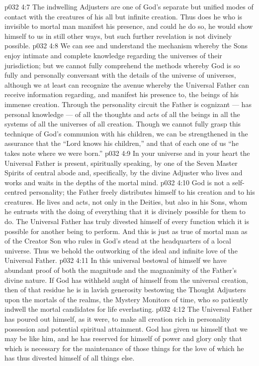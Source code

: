 \vs p032 4:7 The indwelling Adjusters are one of God’s separate but unified modes of contact with the creatures of his all but infinite creation. Thus does he who is invisible to mortal man manifest his presence, and could he do so, he would show himself to us in still other ways, but such further revelation is not divinely possible.
\vs p032 4:8 We can see and understand the mechanism whereby the Sons enjoy intimate and complete knowledge regarding the universes of their jurisdiction; but we cannot fully comprehend the methods whereby God is so fully and personally conversant with the details of the universe of universes, although we at least can recognize the avenue whereby the Universal Father can receive information regarding, and manifest his presence to, the beings of his immense creation. Through the personality circuit the Father is cognizant --- has personal knowledge --- of all the thoughts and acts of all the beings in all the systems of all the universes of all creation. Though we cannot fully grasp this technique of God’s communion with his children, we can be strengthened in the assurance that the “Lord knows his children,” and that of each one of us “he takes note where we were born.”
\vs p032 4:9 \pc In your universe and in your heart the Universal Father is present, spiritually speaking, by one of the Seven Master Spirits of central abode and, specifically, by the divine Adjuster who lives and works and waits in the depths of the mortal mind.
\vs p032 4:10 \pc God is not a self\hyp{}centred personality; the Father freely distributes himself to his creation and to his creatures. He lives and acts, not only in the Deities, but also in his Sons, whom he entrusts with the doing of everything that it is divinely possible for them to do. The Universal Father has truly divested himself of every function which it is possible for another being to perform. And this is just as true of mortal man as of the Creator Son who rules in God’s stead at the headquarters of a local universe. Thus we behold the outworking of the ideal and infinite love of the Universal Father.
\vs p032 4:11 In this universal bestowal of himself we have abundant proof of both the magnitude and the magnanimity of the Father’s divine nature. If God has withheld aught of himself from the universal creation, then of that residue he is in lavish generosity bestowing the Thought Adjusters upon the mortals of the realms, the Mystery Monitors of time, who so patiently indwell the mortal candidates for life everlasting.
\vs p032 4:12 The Universal Father has poured out himself, as it were, to make all creation rich in personality possession and potential spiritual attainment. God has given us himself that we may be like him, and he has reserved for himself of power and glory only that which is necessary for the maintenance of those things for the love of which he has thus divested himself of all things else.
